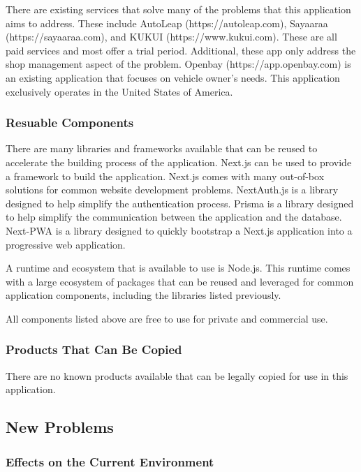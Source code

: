 \documentclass[12pt]{article}
\begin{document}
There are existing services that solve many of the problems that this application aims to address.
These include AutoLeap (https://autoleap.com), Sayaaraa (https://sayaaraa.com), and KUKUI
(https://www.kukui.com). These are all paid services and most offer a trial period. Additional,
these app only address the shop management aspect of the problem. Openbay (https://app.openbay.com)
is an existing application that focuses on vehicle owner's needs. This application exclusively
operates in the United States of America.

\subsubsection{Resuable Components}

There are many libraries and frameworks available that can be reused to accelerate the building
process of the application. Next.js can be used to provide a framework to build the application.
Next.js comes with many out-of-box solutions for common website development problems. NextAuth.js
is a library designed to help simplify the authentication process. Prisma is a library designed to
help simplify the communication between the application and the database. Next-PWA is a library
designed to quickly bootstrap a Next.js application into a progressive web application.

A runtime and ecosystem that is available to use is Node.js. This runtime comes with a large
ecosystem of packages that can be reused and leveraged for common application components, including
the libraries listed previously.

All components listed above are free to use for private and commercial use.

\subsubsection{Products That Can Be Copied}

There are no known products available that can be legally copied for use in this application.

\subsection{New Problems}

\subsubsection{Effects on the Current Environment}
\end{document}
